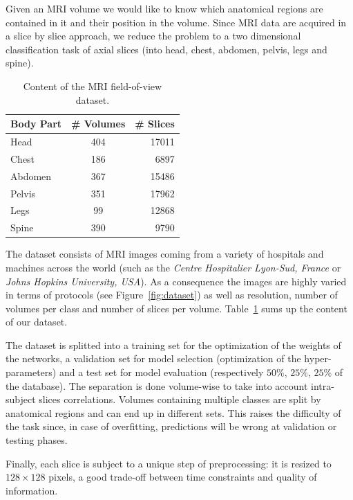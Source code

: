 Given an MRI volume we would like to know which anatomical regions are contained in it and their position in the volume. Since MRI data are acquired in a slice by slice approach, we reduce the problem to a two dimensional classification task of axial slices (into head, chest, abdomen, pelvis, legs and spine).

\begin{table}[htb]
	\centering
	\begin{tabular}{ | l | c | r | }
		\hline
		Body Part & \# Volumes & \# Slices \\ \hline
		Head & 404 & 17011 \\
		Chest & 186 & 6897 \\
		Abdomen & 367 & 15486 \\
		Pelvis & 351 & 17962 \\
		Legs & 99 & 12868 \\
		Spine & 390 & 9790 \\
		\hline
	\end{tabular}
	\caption{Content of the MRI field-of-view dataset.}
	\label{table:dataset}
\end{table}

The dataset consists of MRI images coming from a variety of hospitals and machines across the world (such as the \textit{Centre Hospitalier Lyon-Sud, France} or \textit{ Johns Hopkins University, USA}). As a consequence the images are highly varied in terms of protocols (see Figure~\ref{fig:dataset}) as well as resolution, number of volumes per class and number of slices per volume. Table~\ref{table:dataset} sums up the content of our dataset.

The dataset is splitted into a training set for the optimization of the weights of the networks, a validation set for model selection (optimization of the hyper-parameters) and a test set for model evaluation (respectively $50 \%$, $25 \%$, $25 \%$ of the database). The separation is done volume-wise to take into account intra-subject slices correlations. Volumes containing multiple classes are split by anatomical regions and can end up in different sets. This raises the difficulty of the task since, in case of overfitting, predictions will be wrong at validation or testing phases.


Finally, each slice is subject to a unique step of preprocessing: it is resized to $128 \times 128$ pixels, a good trade-off between time constraints and quality of information.

